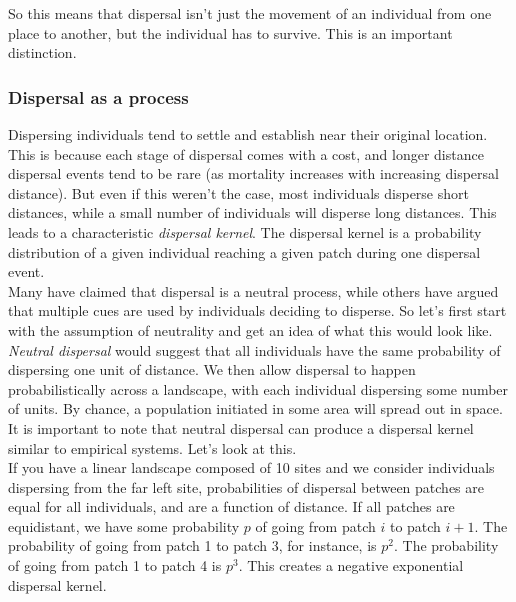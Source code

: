 \documentclass[12pt]{article}
\begin{document}
So this means that dispersal isn't just the movement of an individual from one place to another, but the individual has to survive. This is an important distinction. 












\subsubsection*{Dispersal as a process}

Dispersing individuals tend to settle and establish near their original location. This is because each stage of dispersal comes with a cost, and longer distance dispersal events tend to be rare (as mortality increases with increasing dispersal distance). But even if this weren't the case, most individuals disperse short distances, while a small number of individuals will disperse long distances. This leads to a characteristic \textit{dispersal kernel}. The dispersal kernel is a probability distribution of a given individual reaching a given patch during one dispersal event. \\


Many have claimed that dispersal is a neutral process, while others have argued that multiple cues are used by individuals deciding to disperse. So let's first start with the assumption of neutrality and get an idea of what this would look like. \\









\textit{Neutral dispersal} would suggest that all individuals have the same probability of dispersing one unit of distance. We then allow dispersal to happen probabilistically across a landscape, with each individual dispersing some number of units. By chance, a population initiated in some area will spread out in space. It is important to note that neutral dispersal can produce a dispersal kernel similar to empirical systems. Let's look at this. \\


If you have a linear landscape composed of 10 sites and we consider individuals dispersing from the far left site, probabilities of dispersal between patches are equal for all individuals, and are a function of distance. If all patches are equidistant, we have some probability $p$ of going from patch $i$ to patch $i+1$. The probability of going from patch 1 to patch 3, for instance, is $p^{2}$. The probability of going from patch 1 to patch 4 is $p^{3}$. This creates a negative exponential dispersal kernel. \\
\end{document}

